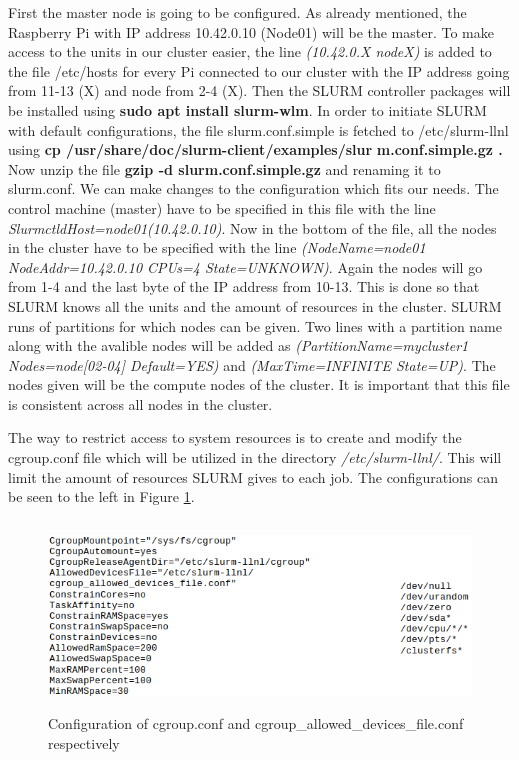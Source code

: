 \documentclass[../Head/Report.tex]{subfiles}
\begin{document}
First the master node is going to be configured. As already mentioned, the Raspberry Pi with IP address 10.42.0.10 (Node01) will be the master. To make access to the units in our cluster easier, the line \textit{(10.42.0.X nodeX)} is added to the file /etc/hosts for every Pi connected to our cluster with the IP address going from 11-13 (X) and node from 2-4 (X). Then the SLURM controller packages will be installed using \textbf{sudo apt install slurm-wlm}. In order to initiate SLURM with default configurations, the file slurm.conf.simple is fetched to /etc/slurm-llnl using \textbf{cp /usr/share/doc/slurm-client/examples/slur} \textbf{m.conf.simple.gz .} Now unzip the file \textbf{gzip -d slurm.conf.simple.gz} and renaming it to slurm.conf. We can make changes to the configuration which fits our needs. The control machine (master) have to be specified in this file with the line \textit{ SlurmctldHost=node01(10.42.0.10)}. Now in the bottom of the file, all the nodes in the cluster have to be specified with the line \textit{(NodeName=node01 NodeAddr=10.42.0.10 CPUs=4 State=UNKNOWN)}. Again the nodes will go from 1-4 and the last byte of the IP address from 10-13. This is done so that SLURM knows all the units and the amount of resources in the cluster. SLURM runs of partitions for which nodes can be given. Two lines with a partition name along with the avalible nodes will be added as \textit{(PartitionName=mycluster1 Nodes=node[02-04] Default=YES)} and \textit{(MaxTime=INFINITE State=UP)}. The nodes given will be the compute nodes of the cluster. It is important that this file is consistent across all nodes in the cluster.    

The way to restrict access to system resources is to create and modify the cgroup.conf file which will be utilized in the directory \textit{/etc/slurm-llnl/}. This will limit the amount of resources SLURM gives to each job. The configurations can be seen to the left in Figure \ref{fig:created_files}.     

\begin{figure}[H]
	\centering
	\includegraphics[height=5cm]{../Figures/created_files.png}
    \caption{Configuration of cgroup.conf and cgroup\_allowed\_devices\_file.conf respectively}
    \label{fig:created_files}
\end{figure}
\end{document}
